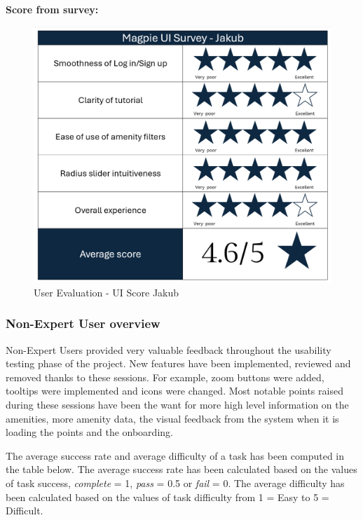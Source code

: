 \textbf{Score from survey: }
\begin{figure}[h!]
    \centering
    \includegraphics[width=\textwidth]{images/survey-jakub.png}
    \caption{User Evaluation - UI Score Jakub}
\end{figure}

\subsubsection{Non-Expert User overview}
Non-Expert Users provided very valuable feedback throughout the usability testing
phase of the project. New features have been implemented, reviewed and removed
thanks to these sessions.
For example, zoom buttons were added, tooltips were implemented and icons were
changed. Most notable points raised during these sessions have been the want for
more high level information on the amenities, more amenity data, the visual
feedback from the system when it is loading the points and the onboarding.

\newpage{}

The average success rate and average difficulty of a task has been computed in
the table below. The average success rate has been calculated based on the
values of task success, \emph{complete} = 1, \emph{pass} = 0.5 or \emph{fail} =
0. The average difficulty has been calculated based on the values of task
difficulty from 1 = Easy to 5 = Difficult.

